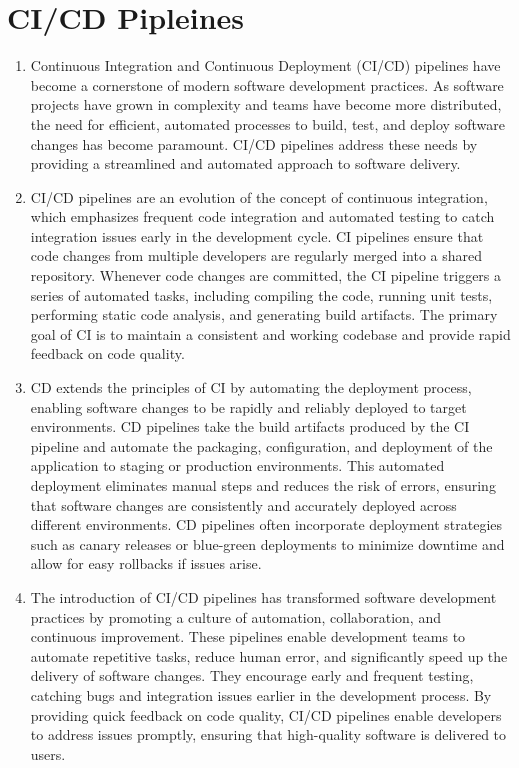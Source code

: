 \section*{CI/CD Pipleines}
\begin{enumerate}
    \item Continuous Integration and Continuous Deployment (CI/CD) pipelines have become a cornerstone of modern software development practices. As software projects have grown in complexity and teams have become more distributed, the need for efficient, automated processes to build, test, and deploy software changes has become paramount. CI/CD pipelines address these needs by providing a streamlined and automated approach to software delivery.

    \item CI/CD pipelines are an evolution of the concept of continuous integration, which emphasizes frequent code integration and automated testing to catch integration issues early in the development cycle. CI pipelines ensure that code changes from multiple developers are regularly merged into a shared repository. Whenever code changes are committed, the CI pipeline triggers a series of automated tasks, including compiling the code, running unit tests, performing static code analysis, and generating build artifacts. The primary goal of CI is to maintain a consistent and working codebase and provide rapid feedback on code quality.

    \item CD extends the principles of CI by automating the deployment process, enabling software changes to be rapidly and reliably deployed to target environments. CD pipelines take the build artifacts produced by the CI pipeline and automate the packaging, configuration, and deployment of the application to staging or production environments. This automated deployment eliminates manual steps and reduces the risk of errors, ensuring that software changes are consistently and accurately deployed across different environments. CD pipelines often incorporate deployment strategies such as canary releases or blue-green deployments to minimize downtime and allow for easy rollbacks if issues arise.

    \item The introduction of CI/CD pipelines has transformed software development practices by promoting a culture of automation, collaboration, and continuous improvement. These pipelines enable development teams to automate repetitive tasks, reduce human error, and significantly speed up the delivery of software changes. They encourage early and frequent testing, catching bugs and integration issues earlier in the development process. By providing quick feedback on code quality, CI/CD pipelines enable developers to address issues promptly, ensuring that high-quality software is delivered to users.


\end{enumerate}
